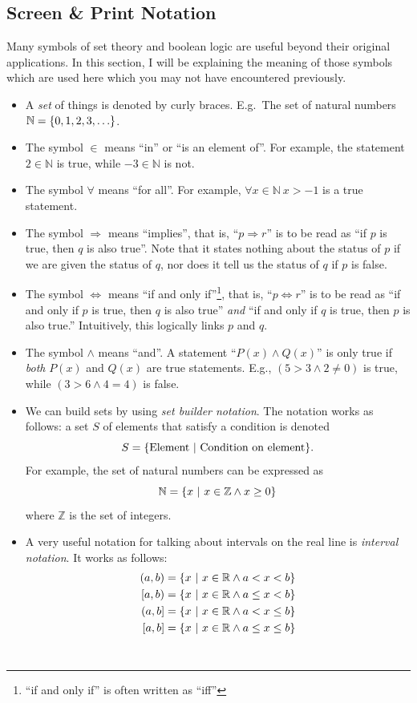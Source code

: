 \documentclass[10pt]{scrartcl}
\numberwithin{equation}{subsection}
\theoremstyle{definition}
\theoremstyle{remark}
\newcommand{\Reals}{\mathbb{R}}
\begin{document}
	\subsection{Screen \& Print Notation}
	Many symbols of set theory and boolean logic are useful beyond their original applications.
	In this section, I will be explaining the meaning of those symbols which are used here which you may not have encountered previously.
	\begin{itemize}
		\item A \textit{set} of things is denoted by curly braces. E.g.\ The set of
			natural numbers $\mathbb{N} = \Bqty{0, 1, 2, 3, \ldots}$. \\
		\item The symbol $\in$ means ``in'' or ``is an element of''. For example, the
			statement $2 \in \mathbb{N}$ is true, while $ -3 \in \mathbb{N}$ is
			not.
		\item The symbol $\forall$ means ``for all''. For example, $\forall x \in
			\mathbb{N} ~ x > -1$ is a true statement. \\
\item The symbol $\Rightarrow$ means ``implies'', that is, ``$p \Rightarrow
	r$'' is to be read as ``if $p$ is true, then $q$ is also true''.
	Note that it states nothing about the status of $p$ if we are given the status of $q$,
	nor does it tell us the status of $q$ if $p$ is false. \\
\item The symbol $\iff$ means ``if and only if''\footnote{``if and only if'' is
	often written as ``iff''}, that is, ``$p \iff r$'' is to be read as
	``if and only if $p$ is true, then $q$ is also true'' \emph{and} ``if
	and only if $q$ is true, then $p$ is also true.'' Intuitively, this
	logically links $p$ and $q$.
\item The symbol $\wedge$ means ``and''. A statement ``$P(x) \wedge Q(x)$'' is
	only true if \emph{both} $P(x)$ and $Q(x)$ are true statements. 
	E.g., $(5>3 \wedge 2 \neq 0)$ is true, while $(3>6 \wedge 4 = 4)$ is false. \\
\item We can build sets by using \textit{set builder notation}.
	The notation works as follows: a set $S$ of elements that satisfy a condition
	is denoted 
	\[
		S = \Bqty{\text{Element}~|~\text{Condition on element}}.
	\]
	For example, the set of natural numbers can be expressed as 
	\[
		\mathbb{N} = \Bqty{x~|~x \in \mathbb{Z} \wedge x \geq 0}
	\]
	where $\mathbb{Z}$ is the set of integers. \\
\item A very useful notation for talking about intervals on the real line is \textit{interval notation}. It works as follows:
	\begin{align*}
		(a,b) &= \Bqty{x~|~x \in \Reals \wedge a<x<b} \\
		[a,b) &= \Bqty{x~|~x \in \Reals \wedge a\leq x<b} \\
		(a,b] &= \Bqty{x~|~x \in \Reals \wedge a<x\leq b} \\
		[a,b] &= \Bqty{x~|~x \in \Reals \wedge a\leq x\leq b} \\
	\end{align*} \\



\end{itemize}
\end{document}
